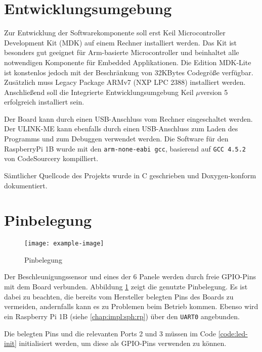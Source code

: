 \section{Entwicklungsumgebung}
Zur Entwicklung der Softwarekomponente soll erst Keil\textsuperscript{\scriptsize\textregistered} Microcontroller Development Kit (MDK) auf einem Rechner installiert werden. Das Kit ist besonders gut geeignet für Arm\textsuperscript{\scriptsize\textregistered}-basierte Microcontroller und beinhaltet alle notwendigen Komponente für Embedded Applikationen. Die Edition MDK-Lite ist konstenlos jedoch mit der Beschränkung von 32KBytes Codegröße verfügbar. Zusätzlich muss Legacy Package ARMv7 (NXP LPC 2388) installiert werden. Anschließend soll die Integrierte Entwicklungsumgebung Keil $\mu$version 5 erfolgreich installiert sein.

Der Board kann durch einen USB-Anschluss vom Rechner eingeschaltet werden. Der ULINK-ME kann ebenfalls durch einen USB-Anschluss zum Laden des Programms und zum Debuggen verwendet werden.
Die Software für den RaspberryPi 1B wurde mit den \texttt{arm-none-eabi gcc}, basierend auf \texttt{GCC 4.5.2} von CodeSourcery kompilliert.

Sämtlicher Quellcode des Projekts wurde in C geschrieben und Doxygen-konform dokumentiert.


\section{Pinbelegung}

\begin{figure}
	\centering
	\texttt{[image: example-image]}
	\caption[Pinbelegung]{Pinbelegung}
	\label{fig:pins}
\end{figure}

Der Beschleunigungssensor und eines der 6 Panele werden durch freie GPIO-Pins mit dem Board verbunden. Abbildung \ref{fig:pins} zeigt die genutzte Pinbelegung. Es ist dabei zu beachten, die bereits vom Hersteller belegten Pins des Boards zu vermeiden, andernfalls kann es zu Problemen beim Betrieb kommen. Ebenso wird ein Raspberry Pi 1B (siehe \ref{chap:impl:sph:rp}) über den \texttt{UART0} angebunden.

Die belegten Pins und die relevanten Ports 2 und 3 müssen im Code \ref{code:led-init} initialisiert werden, um diese als GPIO-Pins verwenden zu können.
